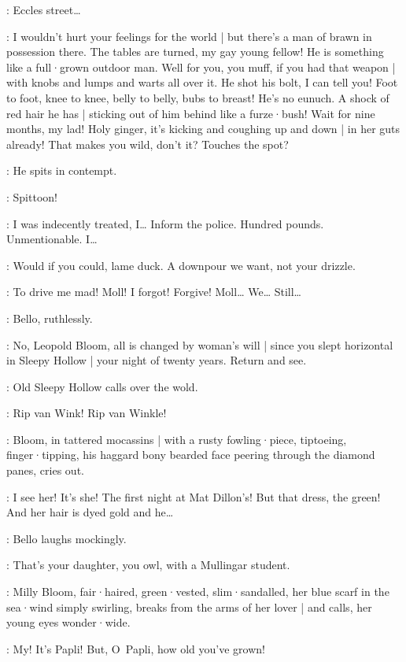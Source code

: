 \Bloom:
Eccles street…

\Bello:
I wouldn't hurt your feelings for the world |
but there's a man of brawn in possession there.
The tables are turned,
my gay young fellow!
He is something like a full·grown outdoor man.
Well for you,
you muff,
if you had that weapon |
with knobs and lumps and warts all over it.
He shot his bolt,
I can tell you!
%
Foot to foot,
knee to knee,
belly to belly,
bubs to breast!
He's no eunuch.
A shock of red hair he has |
sticking out of him behind like a furze·bush!
Wait for nine months,
my lad!
Holy ginger,
it's kicking and coughing up and down |
in her guts already!
That makes you wild,
don't it?
Touches the spot?

:
He spits in contempt.

\Bello:
Spittoon!

\Bloom:
I was indecently treated,
I…
Inform the police.
Hundred pounds.
Unmentionable.
I…

\Bello:
Would if you could,
lame duck.
A downpour we want,
not your drizzle.

\Bloom:
To drive me mad!
Moll!
I forgot!
Forgive!
Moll…
We…
Still…

:
Bello,
ruthlessly.

\Bello:
No,
Leopold Bloom,
all is changed by woman's will |
since you slept horizontal in Sleepy Hollow |
your night of twenty years.
Return and see.

:
Old Sleepy Hollow calls over the wold.

\SleepyHollow:
Rip van Wink!
Rip van Winkle!

:
Bloom,
in tattered mocassins |
with a rusty fowling·piece,
%
tiptoeing,
finger·tipping,
his haggard bony bearded face peering through the diamond panes,
cries out.

\Bloom:
I see her!
It's she!
The first night at Mat Dillon's!
But that dress,
the green!
And her hair is dyed gold and he…

:
Bello laughs mockingly.

\Bello:
That's your daughter,
you owl,
with a Mullingar student.

:
Milly Bloom,
fair·haired,
green·vested,
slim·sandalled,
her blue scarf in the sea·wind simply swirling,
breaks from the arms of her lover |
and calls,
her young eyes wonder·wide.

\Milly:
My!
It's Papli!
But,
O~Papli,
how old you've grown!

